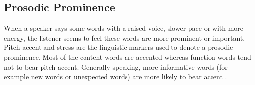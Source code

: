 %
%
%
%
%

\subsection{Prosodic Prominence}
When a speaker says some words with a raised voice, slower pace or with more energy, the listener seems to feel these words are more prominent or important. Pitch accent and stress are the linguistic markers used to denote a prosodic prominence. Most of the content words are accented whereas function words tend not to bear pitch accent. Generally speaking, more informative words (for example new words or unexpected words) are more likely to bear accent \citep{Beckman1986, Bagshaw1994}.

